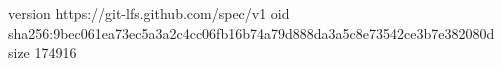 version https://git-lfs.github.com/spec/v1
oid sha256:9bec061ea73ec5a3a2c4cc06fb16b74a79d888da3a5c8e73542ce3b7e382080d
size 174916
